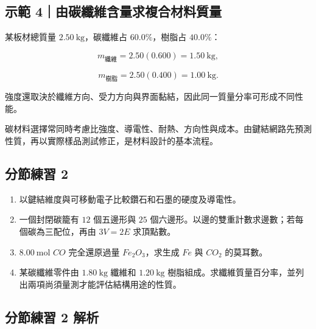 \documentclass[11pt,a4paper]{article}
\providecommand{\tightlist}{%
  \setlength{\itemsep}{0pt}\setlength{\parskip}{0pt}}
\begin{document}
\begin{HandoutWorkedExample}

\subsection{示範 4｜由碳纖維含量求複合材料質量}\label{ux793aux7bc4-4ux7531ux78b3ux7e96ux7dadux542bux91cfux6c42ux8907ux5408ux6750ux6599ux8ceaux91cf}

某板材總質量 \(2.50\ \mathrm{kg}\)，碳纖維占 \(60.0\%\)，樹脂占 \(40.0\%\)：

\[
m_{\text{纖維}}=2.50(0.600)=1.50\ \mathrm{kg},
\]

\[
m_{\text{樹脂}}=2.50(0.400)=1.00\ \mathrm{kg}.
\]

強度還取決於纖維方向、受力方向與界面黏結，因此同一質量分率可形成不同性能。

\end{HandoutWorkedExample}

碳材料選擇常同時考慮比強度、導電性、耐熱、方向性與成本。由鍵結網路先預測性質，再以實際樣品測試修正，是材料設計的基本流程。

\subsection{分節練習 2}\label{ux5206ux7bc0ux7df4ux7fd2-2}

\begin{enumerate}
\def\labelenumi{\arabic{enumi}.}
\tightlist
\item
  以鍵結維度與可移動電子比較鑽石和石墨的硬度及導電性。
\item
  一個封閉碳籠有 \(12\) 個五邊形與 \(25\) 個六邊形。以邊的雙重計數求邊數；若每個碳為三配位，再由 \(3V=2E\) 求頂點數。
\item
  \(8.00\ \mathrm{mol}\) \(CO\) 完全還原過量 \(Fe_2O_3\)，求生成 \(Fe\) 與 \(CO_2\) 的莫耳數。
\item
  某碳纖維零件由 \(1.80\ \mathrm{kg}\) 纖維和 \(1.20\ \mathrm{kg}\) 樹脂組成。求纖維質量百分率，並列出兩項尚須量測才能評估結構用途的性質。
\end{enumerate}

\subsection{分節練習 2 解析}\label{ux5206ux7bc0ux7df4ux7fd2-2-ux89e3ux6790}
\end{document}
